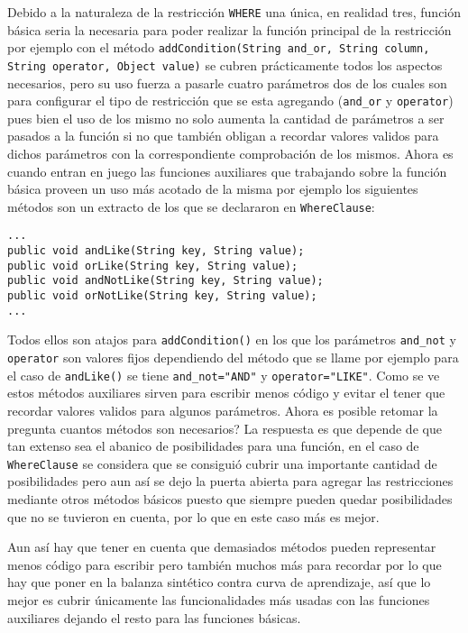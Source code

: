 Debido a la naturaleza de la restricción \verb=WHERE= una única, en realidad tres, función básica seria la necesaria para poder realizar la función principal de la restricción por ejemplo con el método \verb=addCondition(String and_or, String column, String operator, Object value)= se cubren prácticamente todos los aspectos necesarios, pero su uso fuerza a pasarle cuatro parámetros dos de los cuales son para configurar el tipo de restricción que se esta agregando (\verb=and_or= y \verb=operator=) pues bien el uso de los mismo no solo aumenta la cantidad de parámetros a ser pasados a la función si no que también obligan a recordar valores validos para dichos parámetros con la correspondiente comprobación de los mismos. Ahora es cuando entran en juego las funciones auxiliares que trabajando sobre la función básica proveen un uso más acotado de la misma por ejemplo los siguientes métodos son un extracto de los que se declararon en \verb=WhereClause=:
%
\begin{lstlisting}[title=Extracto de WhereClause]
...
public void andLike(String key, String value);
public void orLike(String key, String value);
public void andNotLike(String key, String value);
public void orNotLike(String key, String value);
...
\end{lstlisting}
%
Todos ellos son atajos para \verb=addCondition()= en los que los parámetros \verb=and_not= y \verb=operator= son valores fijos dependiendo del método que se llame por ejemplo para el caso de \verb=andLike()= se tiene \verb|and_not="AND"|  y \verb|operator="LIKE"|. Como se ve estos métodos auxiliares sirven para escribir menos código y evitar el tener que recordar valores validos para algunos parámetros. Ahora es posible retomar la pregunta cuantos métodos son necesarios? La respuesta es que depende de que tan extenso sea el abanico de posibilidades para una función, en el caso de \verb=WhereClause= se considera que se consiguió cubrir una importante cantidad de posibilidades pero aun así se dejo la puerta abierta para agregar las restricciones mediante otros métodos básicos puesto que siempre pueden quedar posibilidades que no se tuvieron en cuenta, por lo que en este caso más es mejor.

Aun así hay que tener en cuenta que demasiados métodos pueden representar menos código para escribir pero también muchos más para recordar por lo que hay que poner en la balanza sintético contra curva de aprendizaje, así que lo mejor es cubrir únicamente las  funcionalidades más usadas con las funciones auxiliares dejando el resto para las funciones básicas.
%
